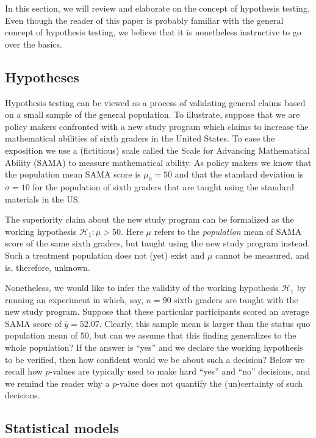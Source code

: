 \documentclass[english,,doc,floatsintext]{apa6}
\begin{document}
In this section, we will review and elaborate on the concept of hypothesis testing. Even though the reader of this paper is probably familiar with the general concept of hypothesis testing, we believe that it is nonetheless instructive to go over the basics.

\hypertarget{hypotheses}{%
\subsection{Hypotheses}\label{hypotheses}}

Hypothesis testing can be viewed as a process of validating general claims based on a small sample of the general population. To illustrate, suppose that we are policy makers confronted with a new study program which claims to increase the mathematical abilities of sixth graders in the United States. To ease the exposition we use a (fictitious) scale called the Scale for Advancing Mathematical Ability (SAMA) to measure mathematical ability. As policy makers we know that the population mean SAMA score is \(\mu_{0}=50\) and that the standard deviation is \(\sigma=10\) for the population of sixth graders that are taught using the standard materials in the US.

The superiority claim about the new study program can be formalized as the working hypothesis \(\mathcal{H}_{1}:\mu > 50\). Here \(\mu\) refers to the \emph{population} mean of SAMA score of the same sixth graders, but taught using the new study program instead. Such a treatment population does not (yet) exist and \(\mu\) cannot be measured, and is, therefore, unknown.

Nonetheless, we would like to infer the validity of the working hypothesis \(\mathcal{H}_{1}\) by running an experiment in which, say, \(n=90\) sixth graders are taught with the new study program. Suppose that these particular participants scored an average SAMA score of \(\bar{y} = 52.07\). Clearly, this sample mean is larger than the status quo population mean of \(50\), but can we assume that this finding generalizes to the whole population? If the answer is \enquote{yes} and we declare the working hypothesis to be verified, then how confident would we be about such a decision? Below we recall how \(p\)-values are typically used to make hard \enquote{yes} and \enquote{no} decisions, and we remind the reader why a \(p\)-value does not quantify the (un)certainty of such decisions.

\hypertarget{statistical-models}{%
\subsection{Statistical models}\label{statistical-models}}
\end{document}
